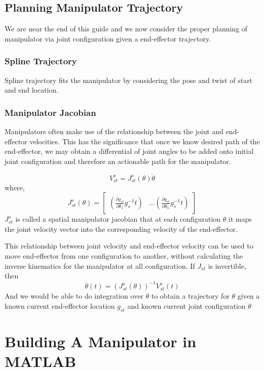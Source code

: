 \documentclass[letterpaper]{article}
\begin{document}
\fi

\subsection{Planning Manipulator Trajectory}
We are near the end of this guide and we now consider the proper planning of manipulator
via joint configuration given a end-effector trajectory.
\subsubsection{Spline Trajectory}
Spline trajectory fits the manipulator by considering the pose and twist of start
and end location. 

\subsubsection{Manipulator Jacobian}
Manipulators often make use of the relationship between the joint and end-effector
velocities. This has the significance that once we know desired path of the 
end-effector, we may obtain a differential of joint angles to be added onto
initial joint configuration and therefore an actionable path for the manipulator.

\begin{equation*}
  V^{s}_{st} = J^{s}_{st}(\theta)\dot{\theta}
\end{equation*}
where,
\begin{equation*}
  J^s_{st}(\theta) = \begin{bmatrix}
    \left(\frac{\partial g_{st}}{\partial \theta_1}g^{-1}_st\right) & \dots
    \left(\frac{\partial g_{st}}{\partial \theta_n}g^{-1}_st\right)
  \end{bmatrix}
\end{equation*}
$J^s_{st}$ is called a spatial manipulator jacobian that at each configuration $\theta$
it maps the joint velocity vector into the corresponding velocity of the
end-effector. 

This relationship between joint velocity and end-effector velocity can be used
to move end-effector from one configuration to another, without calculating the
inverse kinematics for the manipulator at all configuration. If $J_{st}$ is invertible,
then
\begin{equation*}
  \dot{\theta}(t) = \left(J^{s}_{st}(\theta)\right)^{-1}V^{s}_{st}(t)
\end{equation*}
And we would be able to do integration over $\theta$ to obtain a trajectory for 
$\theta$ given a known current end-effector location $g_{st}$ and known
current joint configuration $\theta$

\section{Building A Manipulator in MATLAB}
\end{document}
